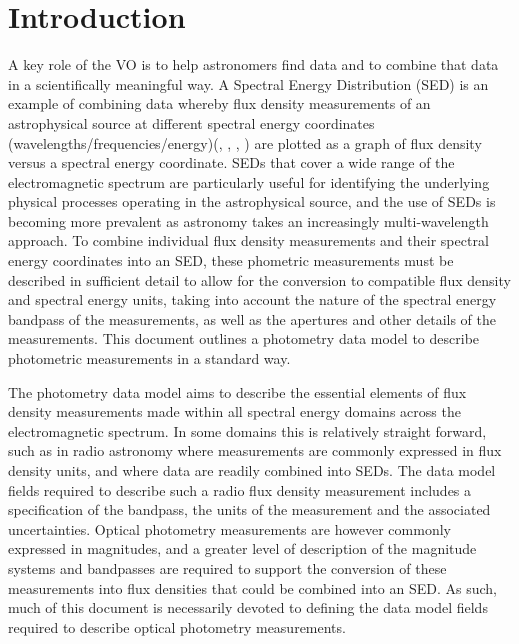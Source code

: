 \documentclass[11pt,a4paper]{ivoa}
\begin{document}
\section{Introduction}
A key role of the VO is to help astronomers find data and to combine that data in a scientifically meaningful way. A Spectral Energy Distribution (SED) is an example of combining data whereby flux density measurements of an astrophysical source at different spectral energy coordinates (wavelengths/frequencies/energy)(\citep{doi:10.1146/annurev.astro.41.082801.100251}, \citep{longo}, \citep{connell}, \citep{brujine}) are plotted as a graph of flux density versus a spectral energy coordinate. SEDs that cover a wide range of the electromagnetic spectrum are particularly useful for identifying the underlying physical processes operating in the astrophysical source, and the use of SEDs is becoming more prevalent as astronomy takes an increasingly multi-wavelength approach. To combine individual flux density measurements and their spectral energy coordinates into an SED, these phometric measurements must be described in sufficient detail to allow for the conversion to compatible flux density and spectral energy units,  taking into account the nature of the spectral energy bandpass of the measurements, as well as the apertures and other details of  the measurements. This document outlines a photometry data model to describe photometric measurements in a standard way.

The photometry data model aims to describe the essential elements of flux density measurements made within all spectral energy domains across the electromagnetic spectrum. In some domains this is relatively straight forward, such as in radio astronomy where measurements are commonly expressed in flux density units, and where data are readily combined into SEDs. The data model fields required to describe such a radio flux density measurement includes a specification of the bandpass, the units of the measurement and the associated uncertainties. Optical photometry measurements are however commonly expressed in magnitudes, and a greater level of description of the magnitude systems and bandpasses are required to support the conversion of these measurements into flux densities that could be combined into an SED. As such, much of this document is necessarily devoted to defining the data model fields required to describe optical photometry measurements.
\end{document}
